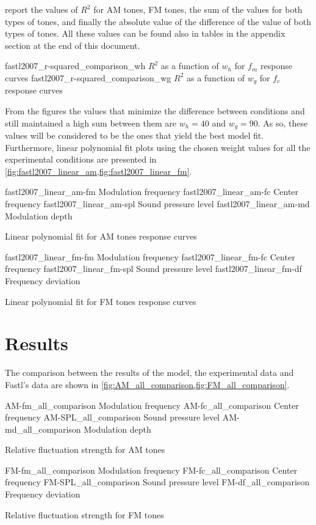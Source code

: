 \documentclass{article}
\begin{document}
report the values of $R^2$ for AM tones, FM tones, the sum of the values for
both types of tones, and finally the absolute value of the difference of the
value of both types of tones. All these values can be found also in tables in
the appendix section at the end of this document.

\myfigurepair%
  {fastl2007_r-squared_comparison_wh}
  {$R^2$ as a function of $w_h$ for $f_m$ response curves}
  {fastl2007_r-squared_comparison_wg}
  {$R^2$ as a function of $w_g$ for $f_c$ response curves}

From the figures the values that minimize the difference between conditions
and still maintained a high sum between them are $w_h = 40$ and $w_g = 90$. As
so, these values will be considered to be the ones that yield the best model
fit. Furthermore, linear polynomial fit plots using the chosen weight values for
all the experimental conditions are presented in
\cref{fig:fastl2007_linear_am,fig:fastl2007_linear_fm}.

\myfigurequad%
  {fastl2007_linear_am-fm}
  {Modulation frequency}
  {fastl2007_linear_am-fc}
  {Center frequency}
  {fastl2007_linear_am-spl}
  {Sound pressure level}
  {fastl2007_linear_am-md}
  {Modulation depth}
  {
    \caption{Linear polynomial fit for AM tones response curves}
    \label{fig:fastl2007_linear_am}
  }

\myfigurequad%
  {fastl2007_linear_fm-fm}
  {Modulation frequency}
  {fastl2007_linear_fm-fc}
  {Center frequency}
  {fastl2007_linear_fm-spl}
  {Sound pressure level}
  {fastl2007_linear_fm-df}
  {Frequency deviation}
  {
    \caption{Linear polynomial fit for FM tones response curves}
    \label{fig:fastl2007_linear_fm}
  }

\section{Results}
\label{sec:results}

The comparison between the results of the model, the experimental data and
Fastl's data are shown in \cref{fig:AM_all_comparison,fig:FM_all_comparison}.

\begin{comparison}

\myfigurequad%
  {AM-fm_all_comparison}
  {Modulation frequency}
  {AM-fc_all_comparison}
  {Center frequency}
  {AM-SPL_all_comparison}
  {Sound pressure level}
  {AM-md_all_comparison}
  {Modulation depth}
  {
    \caption{Relative fluctuation strength for AM tones}
    \label{fig:AM_all_comparison}
  }

\myfigurequad%
  {FM-fm_all_comparison}
  {Modulation frequency}
  {FM-fc_all_comparison}
  {Center frequency}
  {FM-SPL_all_comparison}
  {Sound pressure level}
  {FM-df_all_comparison}
  {Frequency deviation}
  {
    \caption{Relative fluctuation strength for FM tones}
    \label{fig:FM_all_comparison}
  }

\end{comparison}
\end{document}
